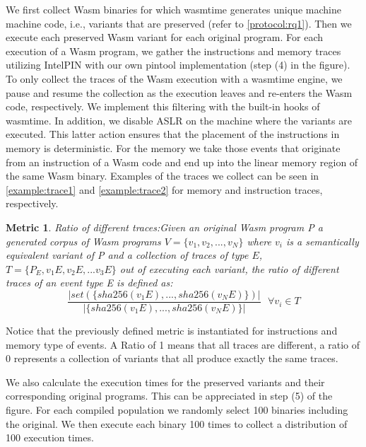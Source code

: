 \documentclass[sigplan,screen]{acmart}
\newcommand{\wasm}{Wasm\xspace}
\newtheorem{metric}{Metric}
\begin{document}
We first collect \wasm binaries for which wasmtime generates unique machine machine code, i.e., variants that are preserved (refer to \autoref{protocol:rq1}).
Then we execute each preserved \wasm variant for each original program.
For each execution of a \wasm program, we gather the instructions and memory traces utilizing IntelPIN with our own pintool implementation \cite{luk2005pin, 10.1145/3478520} (step (4) in the figure).
To only collect the traces of the Wasm execution with a wasmtime engine, we pause and resume the collection as the execution leaves and re-enters the Wasm code, respectively.
We implement this filtering with the built-in hooks of wasmtime.
In addition, we disable ASLR on the machine where the variants are executed.
This latter action ensures that the placement of the instructions in memory is deterministic.
For the memory we take those events that originate from an instruction of a Wasm code and end up into the linear memory region of the same Wasm binary.
Examples of the traces we collect can be seen in \autoref{example:trace1} and \autoref{example:trace2} for memory and instruction traces, respectively.



\begin{metric}{Ratio of different traces:}\label{metric:mem:sha}
Given an original \wasm program P a generated corpus of \wasm programs $V=\{v_1, v_2, ..., v_N\}$ where $v_i$ is a semantically equivalent variant of P and a collection of traces of type $E$, $T=\{P_E, v_1E, v_2E, ...v_3E\}$ out of executing each variant, the ratio of different traces of an event type E is defined as:
$$
    \frac{| set(\{ sha256(v_1E),..., sha256(v_NE) \})|}{| \{ sha256(v_1E),..., sha256(v_NE) \}|}\text{ } \forall v_i \in T
$$

\end{metric}

Notice that the previously defined metric is instantiated for instructions and memory type of events.
A Ratio of 1 means that all traces are different, a ratio of 0 represents a collection of variants that all produce exactly the same traces.

We also calculate the execution times for the preserved variants and their corresponding original programs.
This can be appreciated in step (5) of the figure.
For each compiled population we randomly select 100 binaries including the original.
We then execute each binary 100 times to collect a distribution of 100 execution times.
\end{document}

